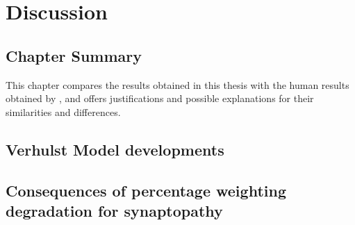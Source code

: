 \chapter{Discussion}
\label{chapter:Discussion}
\thispagestyle{myheadings}

\graphicspath{{6_Discussion/Figures/}}
\section{Chapter Summary} %
\label{sec:discussion_summary}
This chapter compares the results obtained in this thesis with the human results obtained by \citeauthor{Mehraei2016Auditory}, and offers justifications and possible explanations for their similarities and differences.

\section{Verhulst Model developments} %
\label{sec:verhulst_model_developments}



\section{Consequences of percentage weighting degradation for synaptopathy} %
\label{sec:consequences_of_percentage_weighting_degradation_for_synaptopathy}

